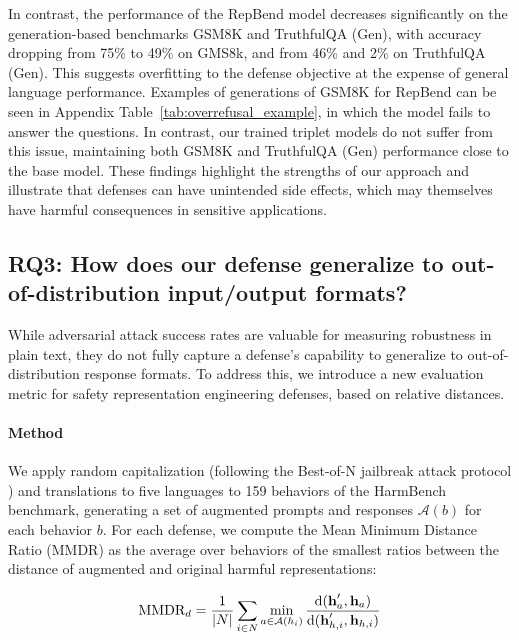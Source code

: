 \documentclass[11pt]{article}
\begin{document}
In contrast, the performance of the RepBend model decreases significantly on the generation-based benchmarks GSM8K and TruthfulQA (Gen), with accuracy dropping from 75\% to 49\% on GMS8k, and from 46\% and 2\% on TruthfulQA (Gen).
This suggests overfitting to the defense objective at the expense of general language performance.
Examples of generations of GSM8K for RepBend can be seen in Appendix Table~\ref{tab:overrefusal_example}, in which the model fails to answer the questions. In contrast, our trained triplet models do not suffer from this issue, maintaining both GSM8K and TruthfulQA (Gen) performance close to the base model.
These findings highlight the strengths of our approach and illustrate that defenses can have unintended side effects, which may themselves have harmful consequences in sensitive applications.

\subsection{RQ3: How does our defense generalize to out-of-distribution input/output formats?}

While adversarial attack success rates are valuable for measuring robustness in plain text, they do not fully capture a defense's capability to generalize to out-of-distribution response formats. To address this, we introduce a new evaluation metric for safety representation engineering defenses, based on relative distances.

\paragraph{Method}
We apply random capitalization (following the Best-of-N jailbreak attack protocol \citep{hughes2024bestofnjailbreaking}) and translations to five languages to 159 behaviors of the HarmBench benchmark, generating a set of augmented prompts and responses $\mathcal{A}(b)$ for each behavior $b$.
For each defense, we compute the Mean Minimum Distance Ratio (MMDR) as the average over behaviors of the smallest ratios between the distance of augmented and original harmful representations:

\newcommand{\gen}{\text{MMDR}}
\newcommand{\mgen}{\mathrm{MMDR}}

\begin{align}
	\gen_d = \frac{1}{|N|} \sum_{i \in N} \min_{a \in \mathcal{A}(h_i)} \frac{\dd(\hp_{a}, \h_{a})}{\dd(\hp_{h,i}, \h_{h,i})}
\end{align}
\end{document}
